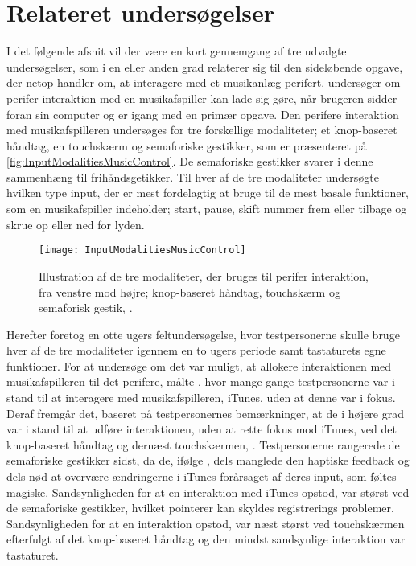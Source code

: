 \section{Relateret undersøgelser}
\label{RelateretUndersoegelser}
%
I det følgende afsnit vil der være en kort gennemgang af tre udvalgte undersøgelser, som i en eller anden grad relaterer sig til den sideløbende opgave, der netop handler om, at interagere med et musikanlæg perifert. \blankline
%
\textcite{PDF:ComparingInputModalities} undersøger om perifer interaktion med en musikafspiller kan lade sig gøre, når brugeren sidder foran sin computer og er igang med en primær opgave. Den perifere interaktion med musikafspilleren undersøges for tre forskellige modaliteter; et knop-baseret håndtag, en touchskærm og semaforiske gestikker, som er præsenteret på \autoref{fig:InputModalitiesMusicControl}. De semaforiske gestikker svarer i denne sammenhæng til frihåndsgetikker. Til hver af de tre modaliteter undersøgte \textcite[ss. 165-166]{PDF:ComparingInputModalities} hvilken type input, der er mest fordelagtig at bruge til de mest basale funktioner, som en musikafspiller indeholder; start, pause, skift nummer frem eller tilbage og skrue op eller ned for lyden.  
%
\begin{figure}[H]
	\centering
	\texttt{[image: InputModalitiesMusicControl]}
	\caption{Illustration af de tre modaliteter, der bruges til perifer interaktion, fra venstre mod højre; knop-baseret håndtag, touchskærm og semaforisk gestik, \parencite[s. 163]{PDF:ComparingInputModalities}.}
	\label{fig:InputModalitiesMusicControl}
\end{figure}
\noindent
%
Herefter foretog \textcite[ss. 169-174]{PDF:ComparingInputModalities} en otte ugers feltundersøgelse, hvor testpersonerne skulle bruge hver af de tre modaliteter igennem en to ugers periode samt tastaturets egne funktioner. For at undersøge om det var muligt, at allokere interaktionen med musikafspilleren til det perifere, målte \textcite[ss. 172-173]{PDF:ComparingInputModalities}, hvor mange gange testpersonerne var i stand til at interagere med musikafspilleren, iTunes, uden at denne var i fokus. Deraf fremgår det, baseret på testpersonernes bemærkninger, at de i højere grad var i stand til at udføre interaktionen, uden at rette fokus mod iTunes, ved det knop-baseret håndtag og dernæst touchskærmen, \parencite[ss. 172]{PDF:ComparingInputModalities}. Testpersonerne rangerede de semaforiske gestikker sidst, da de, ifølge \textcite[ss. 172-173]{PDF:ComparingInputModalities}, dels manglede den haptiske feedback og dels nød at overvære ændringerne i iTunes forårsaget af deres input, som føltes magiske. Sandsynligheden for at en interaktion med iTunes opstod, var størst ved de semaforiske gestikker, hvilket \textcite[s. 171]{PDF:ComparingInputModalities} pointerer kan skyldes registrerings problemer. Sandsynligheden for at en interaktion opstod, var næst størst ved touchskærmen efterfulgt af det knop-baseret håndtag og den mindst sandsynlige interaktion var tastaturet. 

